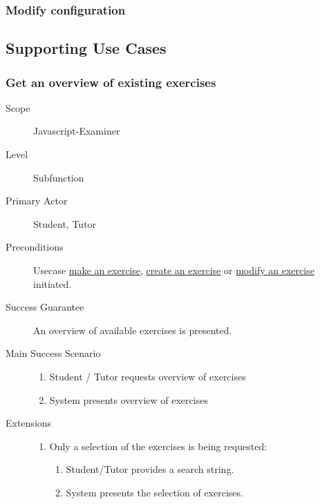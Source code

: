 \documentclass{article}
\begin{document}
\subsubsection{Modify configuration}
\newpage
\subsection{Supporting Use Cases}

\subsubsection{Get an overview of existing exercises}
\begin{mdframed} [rightmargin=-100pt]
\begin{description}
  \item[Scope] Javascript-Examiner
  \item[Level] Subfunction
  \item[Primary Actor] Student, Tutor
  \item[Preconditions] Usecase \underline{make an exercise}, 
							   \underline{create an exercise} or
							   \underline{modify an exercise} initiated.
  \item[Success Guarantee] An overview of available exercises is 
    presented.
  \item[Main Success Scenario] \mbox{}
    \begin{enumerate} 
	  \item Student / Tutor requests overview of exercises
	  \item System presents overview of exercises
	\end{enumerate}
  \item[Extensions] \mbox{}
    \begin{enumerate}
	  \renewcommand{\labelenumi}{\theenumi a.}
	  \item Only a selection of the exercises is being requested:
		\begin{enumerate}[(1)]
		  \renewcommand{\labelenumii}{\theenumii .}
		  \item Student/Tutor provides a search string.
		  \item System presents the selection of exercises.
		\end{enumerate}
	\end{enumerate}
\end{description}
\end{mdframed}
\end{document}
